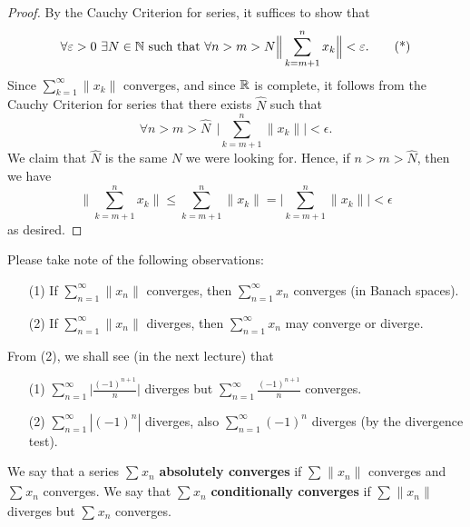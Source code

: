 \documentclass[a4paper]{article}
\begin{document}
\begin{proof}
    By the Cauchy Criterion for series, it suffices to show that 
    \[  \forall \varepsilon > 0 \ \exists N \in \mathbb{N} \ \text{such that} \ \forall n > m > N \Big\|\sum_{ k=m+1 }^{ n } {x}_{k }\Big\| < \varepsilon. \tag{*} \]
    Since \( \sum_{ k=1  }^{ \infty   } \|{x}_{k }\|  \) converges, and since \( \mathbb{R}  \) is complete, it follows from the Cauchy Criterion for series that there exists \( \hat{N} \) such that 
    \[ \forall n> m > \hat{N} \ \ \Big| \sum_{ k= m +1 }^{ n  } \|{x}_{k }\| \Big| < \epsilon.  \]
    We claim that \( \hat{N} \) is the same \( N  \) we were looking for. Hence, if \( n > m > \hat{N} \), then we have
    \[  \Big\| \sum_{ k=m+1 }^{ n  } {x}_{k }  \Big\| \leq \sum_{ k= m+1 }^{ n  } \| {x}_{k} \| = \Big|  \sum_{ k= m+1 }^{ n  } \|{x}_{k }\| \Big|  < \epsilon  \]
    as desired.
\end{proof}

Please take note of the following observations: 

\begin{enumerate}
    \item[(1)] If \( \sum_{ n=1  }^{ \infty  } \|{x}_{n}\| \) converges, then \( \sum_{ n=1  }^{ \infty  } {x}_{n} \) converges (in Banach spaces).
    \item[(2)] If \( \sum_{ n=1  }^{ \infty  } \|{x}_{n}\|  \) diverges, then \( \sum_{ n=1  }^{ \infty  } {x}_{n} \) may converge or diverge.
\end{enumerate}

From (2), we shall see (in the next lecture) that
\begin{enumerate}
    \item[(1)] \( \sum_{ n=1  }^{ \infty  } \Big| \frac{ (-1)^{n+1} }{ n }  \Big|   \) diverges but \( \sum_{ n=1  }^{ \infty   } \frac{ (-1)^{n+1} }{ n }   \) converges.
    \item[(2)] \( \sum_{ n=1  }^{ \infty  } | (-1)^{n} |  \) diverges, also \( \sum_{ n=1  }^{ \infty  } (-1)^{n} \) diverges (by the divergence test).
\end{enumerate}

\begin{definition}
    We say that a series \( \sum_{  }^{  }{x}_{n} \) \textbf{absolutely converges} if \( \sum_{  }^{  } \|{x}_{n}\| \) converges and \( \sum_{  }^{  } {x}_{n} \) converges. We say that \( \sum_{  }^{  }{x}_{n} \) \textbf{conditionally converges} if \( \sum_{  }^{  } \|{x}_{n}\|  \) diverges but \( \sum_{  }^{  } {x}_{n} \) converges. 
\end{definition}
\end{document}
